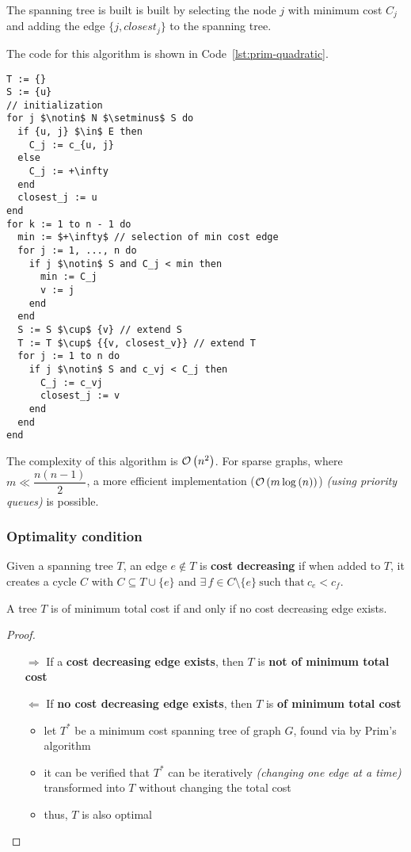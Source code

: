 \documentclass[english]{article}
\begin{document}
The spanning tree is built is built by selecting the node \(j\) with minimum cost \(C_j\) and adding the edge \(\{j, \textit{closest}_j\}\) to the spanning tree.

\bigskip
The code for this algorithm is shown in Code~\ref{lst:prim-quadratic}.

\begin{lstlisting}[caption={Prim's algorithm in quadratic time}, label={lst:prim-quadratic}, float]
T := {}
S := {u}
// initialization
for j $\notin$ N $\setminus$ S do
  if {u, j} $\in$ E then
    C_j := c_{u, j}
  else
    C_j := +\infty
  end
  closest_j := u
end
for k := 1 to n - 1 do
  min := $+\infty$ // selection of min cost edge
  for j := 1, ..., n do
    if j $\notin$ S and C_j < min then
      min := C_j
      v := j
    end
  end
  S := S $\cup$ {v} // extend S
  T := T $\cup$ {{v, closest_v}} // extend T
  for j := 1 to n do
    if j $\notin$ S and c_vj < C_j then
      C_j := c_vj
      closest_j := v
    end
  end
end
\end{lstlisting}

\bigskip
The complexity of this algorithm is \(\mathcal{O}\left(n^2\right)\).
For sparse graphs, where \(m \ll \dfrac{n(n-1)}{2}\), a more efficient implementation (\(\mathcal{O}\left(m \log{(n)}\right)\)) \textit{(using priority queues)} is possible.

\subsubsection{Optimality condition}

Given a spanning tree \(T\), an edge \(e \notin T\) is \textbf{cost decreasing} if when added to \(T\), it creates a cycle \(C\) with \(C \subseteq T \cup \{e\}\) and \(\exists \, f \in C \setminus \{e\} \ \text{such that} \  c_e < c_f\).

\begin{theorem}
  A tree \(T\) is of minimum total cost if and only if no cost decreasing edge exists.
\end{theorem}

\begin{proof}
  \hfill
  \begin{itemize}
    \item[\(\Rightarrow\)] If a \textbf{cost decreasing edge exists}, then \(T\) is \textbf{not of minimum total cost}
    \item[\(\Leftarrow\)] If \textbf{no cost decreasing edge exists}, then \(T\) is \textbf{of minimum total cost}
      \begin{itemize}
        \item let \(T^\ast\) be a minimum cost spanning tree of graph \(G\), found via by Prim's algorithm
        \item it can be verified that \(T^\ast\) can be iteratively \textit{(changing one edge at a time)} transformed into \(T\) without changing the total cost
        \item thus, \(T\) is also optimal
      \end{itemize}
  \end{itemize}

\end{proof}
\end{document}
